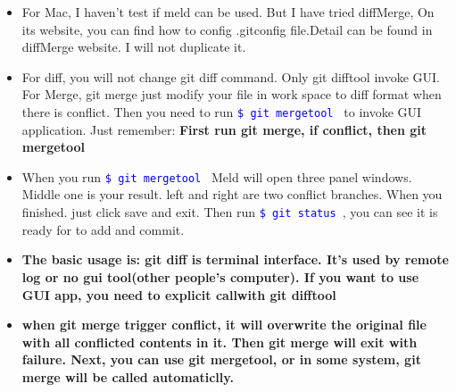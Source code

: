 \documentclass[a4paper,11pt,twoside]{book}
\newcommand{\linuxcommand}[1]{\texttt{\textcolor{blue}{\$ #1 \Pisymbol{psy}{191}}}}
\begin{document}
\begin{itemize}
\begin{enumerate}
\end{enumerate}

\begin{verbatim}       
[diff]
	tool = meld
[difftool]
	prompt = false
[difftool "meld"]
	cmd = \"C:/Program Files (x86)/Meld/Meld.exe\" $LOCAL $REMOTE


[merge]
tool = meld

[mergetool "meld"]
keepBackup = false
trustExitCode = false

[mergetool "meld"]
path = C:\\Program Files (x86)\\Meld\\Meld.exe
\end{verbatim}



      \item For Mac, I haven't test if meld can be used. But I have tried diffMerge, On its website, you can find how to config .gitconfig file.Detail can be found in diffMerge website. I will not duplicate it.

      \item For diff, you will not change git diff command. Only git difftool invoke GUI. For Merge, git merge just modify your file in work space to diff format when there is conflict. Then you need to run \linuxcommand{git mergetool} to invoke GUI application.  Just remember: \textbf{First run git merge, if conflict, then git mergetool}

\item When you run \linuxcommand{git mergetool} Meld will open three panel windows. Middle one is your result. left and right are two conflict branches.  When you finished. just click save and exit. Then run \linuxcommand{git status}, you can see it is ready for to add and commit. 

\item \textbf{The basic usage is: git diff is terminal interface. It's used by remote log or no gui tool(other people's computer). If you want to use GUI app, you need to explicit callwith git difftool}
		
\item \textbf{when git merge trigger conflict, it will overwrite the original  file with all conflicted contents in it. Then git merge will exit with failure. Next, you can use git mergetool, or in some system, git merge will be called automaticlly.}

\end{itemize}
\end{document}
